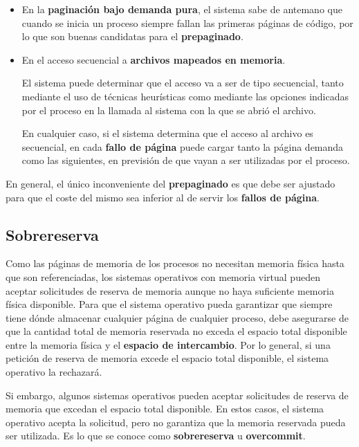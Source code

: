 \begin{itemize}
\item
  En la \textbf{paginación bajo demanda pura}, el sistema sabe de
  antemano que cuando se inicia un proceso siempre fallan las primeras
  páginas de código, por lo que son buenas candidatas para el
  \textbf{prepaginado}.
\item
  En el acceso secuencial a \textbf{archivos mapeados en memoria}.

  El sistema puede determinar que el acceso va a ser de tipo secuencial,
  tanto mediante el uso de técnicas heurísticas como mediante las
  opciones indicadas por el proceso en la llamada al sistema con la que
  se abrió el archivo.

  En cualquier caso, si el sistema determina que el acceso al archivo es
  secuencial, en cada \textbf{fallo de página} puede cargar tanto la
  página demanda como las siguientes, en previsión de que vayan a ser
  utilizadas por el proceso.
\end{itemize}

En general, el único inconveniente del \textbf{prepaginado} es que debe
ser ajustado para que el coste del mismo sea inferior al de servir los
\textbf{fallos de página}.

\subsection{Sobrereserva}\label{_sobrereserva}

{} {} Como las páginas de memoria de los procesos no necesitan memoria
física hasta que son referenciadas, los sistemas operativos con memoria
virtual pueden aceptar solicitudes de reserva de memoria aunque no haya
suficiente memoria física disponible. Para que el sistema operativo
pueda garantizar que siempre tiene dónde almacenar cualquier página de
cualquier proceso, debe asegurarse de que la cantidad total de memoria
reservada no exceda el espacio total disponible entre la memoria física
y el \textbf{espacio de intercambio}. Por lo general, si una petición de
reserva de memoria excede el espacio total disponible, el sistema
operativo la rechazará.

Si embargo, algunos sistemas operativos pueden aceptar solicitudes de
reserva de memoria que excedan el espacio total disponible. En estos
casos, el sistema operativo acepta la solicitud, pero no garantiza que
la memoria reservada pueda ser utilizada. Es lo que se conoce como
\textbf{sobrereserva} u \textbf{\textbf{overcommit}}.


